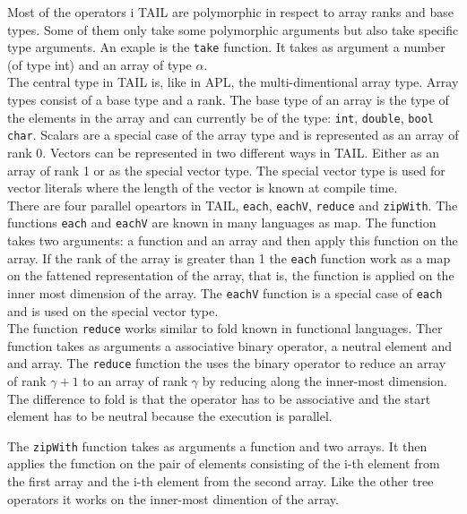 \documentclass[11pt]{article}
\begin{document}
Most of the operators i TAIL are polymorphic in respect to array ranks and base types.
Some of them only take some polymorphic arguments but also take specific type arguments.
An exaple is the {\tt take} function. It takes as argument a number (of type int) and an array of type $\alpha$.\\

The central type in TAIL is, like in APL, the multi-dimentional array type.
Array types consist of a base type and a rank.
The base type of an array is the type of the elements in the array and can currently be of the
type: {\tt int}, {\tt double}, {\tt bool} {\tt char}. 
Scalars are a special case of the array type and is represented as an array of rank 0. 
Vectors can be represented in two different ways in TAIL.
Either as an array of rank 1 or as the special vector type.
The special vector type is used for vector literals where the length of the vector is known at compile time. \\


There are four parallel opeartors in TAIL, {\tt each}, {\tt eachV}, {\tt reduce} and {\tt zipWith}.
The functions {\tt each} and {\tt eachV} are known in many languages as map.
The function takes two arguments: a function and an array and then apply this function on the array.
If the rank of the array is greater than 1 the {\tt each} function work as a map on the fattened representation of the array,
that is, the function is applied on the inner most dimension of the array.
The {\tt eachV} function is a special case of {\tt each} and is used on the special vector type.\\

The function {\tt reduce} works similar to fold known in functional languages.
Ther function takes as arguments a associative binary operator, a neutral element and and array.
The {\tt reduce} function the uses the binary operator 
to reduce an array of rank $\gamma+1$ to an array of rank $\gamma$ by reducing along the inner-most dimension.
The difference to fold is that the operator has to be associative and the start element has to be neutral
because the execution is parallel.

The {\tt zipWith} function takes as arguments a function and two arrays.
It then applies the function on the pair of elements consisting of the i-th element
from the first array and the i-th element from the second array.
Like the other tree operators it works on the inner-most dimention of the array. \\
\end{document}

